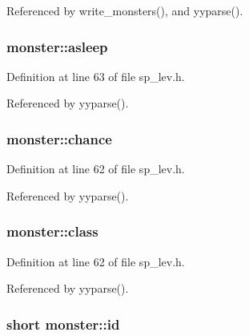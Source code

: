 Referenced by write\+\_\+monsters(), and yyparse().

\hypertarget{structmonster_a8fd73840258e9cc6bb1f68e99b4a2fbd}{
\subsubsection[{asleep}]{ monster\+::asleep}}\label{structmonster_a8fd73840258e9cc6bb1f68e99b4a2fbd}


Definition at line 63 of file sp\+\_\+lev.\+h.



Referenced by yyparse().

\hypertarget{structmonster_ae5fb6db682fc3fd0c092b366759e18f5}{
\subsubsection[{chance}]{ monster\+::chance}}\label{structmonster_ae5fb6db682fc3fd0c092b366759e18f5}


Definition at line 62 of file sp\+\_\+lev.\+h.



Referenced by yyparse().

\hypertarget{structmonster_a4b3f5c37c4152aa7007f9973c816912e}{
\subsubsection[{class}]{ monster\+::class}}\label{structmonster_a4b3f5c37c4152aa7007f9973c816912e}


Definition at line 62 of file sp\+\_\+lev.\+h.



Referenced by yyparse().

\hypertarget{structmonster_a0f93873707206ac7f13bc2463bc0ad3b}{
\subsubsection[{id}]{\setlength{\rightskip}{0pt plus 5cm}short monster\+::id}}\label{structmonster_a0f93873707206ac7f13bc2463bc0ad3b}


